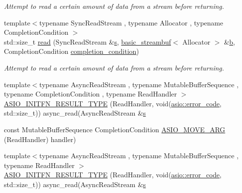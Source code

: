 \begin{DoxyCompactItemize}
\begin{DoxyCompactList}\small\item\em Attempt to read a certain amount of data from a stream before returning. \end{DoxyCompactList}\item 
{\footnotesize template$<$typename Sync\+Read\+Stream , typename Allocator , typename Completion\+Condition $>$ }\\std\+::size\+\_\+t \hyperlink{group__read_gaeadfb55ae835155abb8b6dc11a063b54}{read} (Sync\+Read\+Stream \&\hyperlink{group__async__connect_ga31ab74b9ea6c77932dddd016cfc7920a}{s}, \hyperlink{classasio_1_1basic__streambuf}{basic\+\_\+streambuf}$<$ Allocator $>$ \&\hyperlink{group__async__read_ga945a5c18fa77a9e2eba420f8f44b2a4f}{b}, Completion\+Condition \hyperlink{group__async__read_gae2e215d5013596cc2b385bb6c13fa518}{completion\+\_\+condition})
\begin{DoxyCompactList}\small\item\em Attempt to read a certain amount of data from a stream before returning. \end{DoxyCompactList}\item 
{\footnotesize template$<$typename Async\+Read\+Stream , typename Mutable\+Buffer\+Sequence , typename Completion\+Condition , typename Read\+Handler $>$ }\\\hyperlink{group__async__read_gab321259782b3683c80f33eb1050a3251}{A\+S\+I\+O\+\_\+\+I\+N\+I\+T\+F\+N\+\_\+\+R\+E\+S\+U\+L\+T\+\_\+\+T\+Y\+P\+E} (Read\+Handler, void(\hyperlink{classasio_1_1error__code}{asio\+::error\+\_\+code}, std\+::size\+\_\+t)) async\+\_\+read(Async\+Read\+Stream \&\hyperlink{group__async__connect_ga31ab74b9ea6c77932dddd016cfc7920a}{s}
\item 
const Mutable\+Buffer\+Sequence Completion\+Condition \hyperlink{group__async__read_gac41f6414b06e189a76689422b8e2db35}{A\+S\+I\+O\+\_\+\+M\+O\+V\+E\+\_\+\+A\+R\+G} (Read\+Handler) handler)
\item 
{\footnotesize template$<$typename Async\+Read\+Stream , typename Mutable\+Buffer\+Sequence , typename Read\+Handler $>$ }\\\hyperlink{group__async__read_ga3d4f5c52cc8c1c5d16fc7bf7e0f75c4b}{A\+S\+I\+O\+\_\+\+I\+N\+I\+T\+F\+N\+\_\+\+R\+E\+S\+U\+L\+T\+\_\+\+T\+Y\+P\+E} (Read\+Handler, void(\hyperlink{classasio_1_1error__code}{asio\+::error\+\_\+code}, std\+::size\+\_\+t)) async\+\_\+read(Async\+Read\+Stream \&\hyperlink{group__async__connect_ga31ab74b9ea6c77932dddd016cfc7920a}{s}
\item 

\end{DoxyCompactItemize}
